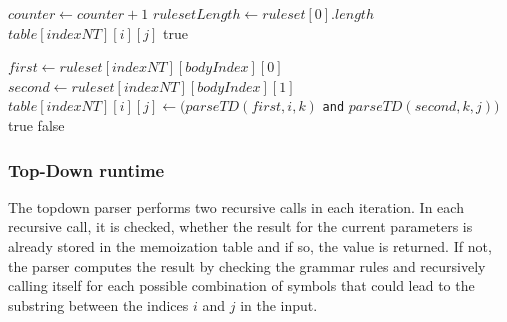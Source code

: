 \documentclass[a4paper, 11pt]{article}
\begin{document}
\begin{center}
\begin{algorithmic}[1]
\State $counter \gets counter+1$
\State $rulesetLength \gets ruleset[0].length$
\State \Return $table[indexNT][i][j]$
\EndIf
{}
\State \Return true
\EndIf
\EndFor

\Else
{}
\State $first \gets ruleset[indexNT][bodyIndex][0]$
\State $second \gets ruleset[indexNT][bodyIndex][1]$
\State $table[indexNT][i][j] \gets (parseTD(first,i,k)$ \texttt{and} $parseTD(second,k,j))$
\State \Return true
\EndIf
\EndFor
\EndIf
\EndFor
\EndIf
\State \Return false
\end{algorithmic}
\hrulefill
\end{center}

\subsubsection{Top-Down runtime}
\label{topdownruntime}



The topdown parser performs two recursive calls in each iteration. In each recursive call, it is checked, whether the result for the current parameters is already stored in the memoization table and if so, the value is returned. If not, the parser computes the result by checking the grammar rules and recursively calling itself for each possible combination of symbols that could lead to the substring between the indices $i$ and $j$ in the input.
\end{document}

